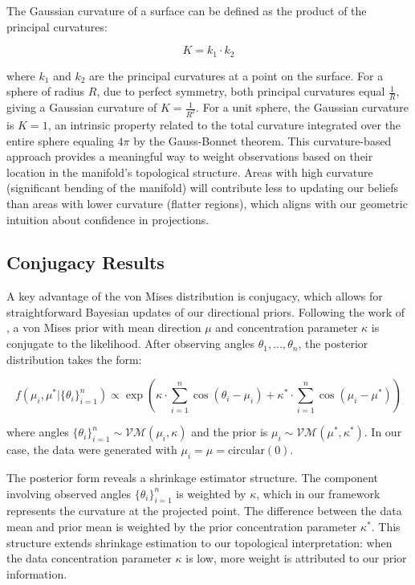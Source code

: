 \documentclass[twoside,11pt]{article}
\begin{document}
The Gaussian curvature of a surface can be defined as the product of the principal curvatures:

$$K = k_1 \cdot k_2$$

where $k_1$ and $k_2$ are the principal curvatures at a point on the surface. For a sphere of radius $R$, due to perfect symmetry, both principal curvatures equal $\frac{1}{R}$, giving a Gaussian curvature of $K = \frac{1}{R^2}$. For a unit sphere, the Gaussian curvature is $K = 1$, an intrinsic property related to the total curvature integrated over the entire sphere equaling $4\pi$ by the Gauss-Bonnet theorem. This curvature-based approach provides a meaningful way to weight observations based on their location in the manifold's topological structure. Areas with high curvature (significant bending of the manifold) will contribute less to updating our beliefs than areas with lower curvature (flatter regions), which aligns with our geometric intuition about confidence in projections.

\subsection{Conjugacy Results}\label{sc:conjugacy}

A key advantage of the von Mises distribution is conjugacy, which allows for straightforward Bayesian updates of our directional priors. Following the work of \citet{mardia1976}, a von Mises prior with mean direction $\mu$ and concentration parameter $\kappa$ is conjugate to the likelihood. After observing angles $\theta_1,\ldots,\theta_n$, the posterior distribution takes the form:

$$
f(\mu_i, \mu^* | \{\theta_i\}_{i=1}^n) \propto \exp(\kappa \cdot \sum_{i=1}^n \cos(\theta_i - \mu_i) +\kappa^* \cdot \sum_{i=1}^n \cos(\mu_i - \mu^*))
$$

where angles $\{\theta_i\}_{i=1}^n \sim \mathcal{VM}(\mu_i, \kappa)$ and the prior is $\mu_i \sim \mathcal{VM}(\mu^*, \kappa^*)$. In our case, the data were generated with $\mu_i = \mu = \text{circular}(0)$.

The posterior form reveals a shrinkage estimator structure. The component involving observed angles $\{\theta_i\}_{i=1}^n$ is weighted by $\kappa$, which in our framework represents the curvature at the projected point. The difference between the data mean and prior mean is weighted by the prior concentration parameter $\kappa^*$. This structure extends shrinkage estimation to our topological interpretation: when the data concentration parameter $\kappa$ is low, more weight is attributed to our prior information.
\end{document}
